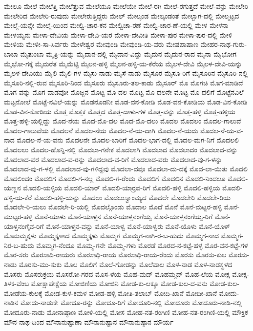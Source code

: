 ಮೇಲೂ
ಮೇಲೆ
ಮೇಲೆತ್ತಿ
ಮೇಲೆತ್ತುವ
ಮೇಲೆಯೂ
ಮೇಲೆಯೇ
ಮೇಲೆ-ರಗಿ
ಮೇಲೆ-ರಗುತ್ತದೆ
ಮೇಲೆ-ವನ್ದು
ಮೇಲೇರಿ
ಮೇಲೇರಿದ
ಮೇಲೇರಿ-ರುವುದು
ಮೇಲೇರುತ್ತಿದ್ದರು
ಮೇಲ್
ಮೇಲ್ಕಂಡ
ಮೇಲ್ಕಂಡಂತೆ
ಮೇಲ್ಬಾಗ-ದಲ್ಲಿ
ಮೇಲ್ಮಟ್ಟದ
ಮೇಲ್ಮೆ-ಯನ್ನೇ
ಮೇಲ್ಮೆ-ಯಿಂದ
ಮೇಲ್ವಿ-ಚಾರ-ಕನ
ಮೇಲ್ವಿಚಾ-ರಣೆ
ಮೇಲ್ವಿ-ಚಾರ-ಣೆ-ಯಲ್ಲಿ
ಮೇಳ
ಮೇಳನಾ
ಮೇಳಯ್ಯನು
ಮೇಳಾ-ದೇವಿಯ
ಮೇಳಾ-ದೇವಿ-ಯರ
ಮೇಳಾ-ದೇವೀತಿ
ಮೇಳಾ-ಪುರ
ಮೇಳಾ-ಪುರ-ದಲ್ಲಿ
ಮೇಳಿ
ಮೇಳಿಯ
ಮೇಳೀ-ಸಾ-ಸಿರ್ವರು
ಮೇಳೇಶ್ವರ
ಮೇವುಂಡಿ
ಮೇವುಂಡಿ-ಯ-ವರು
ಮೇಷಪಾಷಾಣ
ಮೇಹರ-ನಾಥ-ಗುರು-ಬಾಬಾ
ಮೈತುಂಬಾ
ಮೈತ್ರಿ-ಯನ್ನು
ಮೈದಾನ-ದಲ್ಲಿ
ಮೈದಾನ-ವಿದ್ದು
ಮೈದುನ
ಮೈದುನ-ರಾದ
ಮೈನಾ
ಮೈಭೋಗ
ಮೈಭೋ-ಗಕ್ಕೆ
ಮೈಮರೆತ
ಮೈಮೆಟ್ಟಿ
ಮೈಲನ-ಹಳ್ಳಿ
ಮೈಲನ-ಹಳ್ಳಿ-ಯ-ಕೆರೆಯ
ಮೈಲಳ-ದೇವಿ
ಮೈಲಳ-ದೇವಿ-ಯನ್ನು
ಮೈಲಳ-ದೇವಿಯು
ಮೈಲಿ
ಮೈಲಿ-ಗಳ
ಮೈಸು-ನಾಡು-ಮೈಸೆ-ನಾಡು
ಮೈಸೂರ
ಮೈಸೂ-ರಿಗೆ
ಮೈಸೂರಿನ
ಮೈಸೂರಿ-ನಲ್ಲಿ
ಮೈಸೂರಿ-ನಲ್ಲಿ-ರುವ
ಮೈಸೂರಿ-ನಿಂದ
ಮೈಸೂರು
ಮೈಸೂರು-ತಲ-ಕಾಡು
ಮೈಸೂರ್
ಮೊ
ಮೊಗಚಿ
ಮೊಗ-ಮಾಡಿದೆ
ಮೊಗ-ವನ್ನು
ಮೊಗ-ವಾಡವೋ
ಮೊಜ್ಜನ
ಮೊಟ್ಟ-ಮೊ-ದಲ
ಮೊಟ್ಟ-ಮೊ-ದಲನೇ
ಮೊಟ್ಟ-ಮೊ-ದಲಿಗೆ
ಮೊಟ್ಟೆನವಿಲೆ-ಮಟ್ಟನೋಲೆ
ಮೊಟ್ಟೆ-ನವಿಲೆ-ಯನ್ನು
ಮೊಡನೊಡನೀ
ಮೊಡ-ವನ-ಕೋಡಿ
ಮೊಡ-ವನ-ಕೋಡಿಯ
ಮೊಡ-ವಿನ-ಕೋಡಿ
ಮೊಡ-ವಿನ-ಕೋಡಿಯ
ಮೊತ್ತ
ಮೊತ್ತಕ
ಮೊತ್ತದ
ಮೊತ್ತ-ದಾಳು-ಗಳ
ಮೊತ್ತ-ವನ್ನು
ಮೊತ್ತ-ಹಳ್ಳಿ
ಮೊತ್ತ-ಹಳ್ಳಿಯ
ಮೊತ್ತ-ಹಳ್ಳಿ-ಯಲ್ಲಿದ್ದು
ಮೊದ-ನೆಯ
ಮೊದ-ಮೊ-ದಲ
ಮೊದ-ಮೊ-ದಲು
ಮೊದಲ
ಮೊದಲಂ
ಮೊದಲ-ಗಾಲುವೆ
ಮೊದಲ-ಗಾಲುವೆಯ
ಮೊದಲನೆ
ಮೊದಲ-ನೆಯ
ಮೊದಲ-ನೆ-ಯ-ದಾಗಿ
ಮೊದಲ-ನೆ-ಯದು
ಮೊದಲ-ನೆ-ಯ-ವ-ನಾದ
ಮೊದಲ-ನೆ-ಯ-ವನು
ಮೊದಲನೇ
ಮೊದಲ-ಬಾರಿಗೆ
ಮೊದಲ-ಭಾಗ-ದಲ್ಲಿ
ಮೊದಲ-ಮಗ-ನಿಗೆ
ಮೊದಲಲಿ
ಮೊದಲಲು
ಮೊದಲ-ಹೊನ್ನಿ-ನಲ್ಲಿ
ಮೊದಲಾ-ಗನೇಕ
ಮೊದಲಾಗಿ
ಮೊದಲಾದ
ಮೊದಲಾದಂ
ಮೊದಲಾದ-ವನ್ನು
ಮೊದಲಾದ-ವರ
ಮೊದಲಾದ-ವ-ರನ್ನು
ಮೊದಲಾದ-ವ-ರಿಗೆ
ಮೊದಲಾದ-ವರು
ಮೊದಲಾದ-ವು-ಗ-ಳನ್ನು
ಮೊದಲಾದ-ವು-ಗ-ಳಲ್ಲಿ
ಮೊದಲಾದ-ವು-ಗಳಿದ್ದವು
ಮೊದಲಾ-ದವೂ
ಮೊದಲಾ-ದು-ದಕ್ಕೆ
ಮೊದ-ಲಾ-ಯಿತು
ಮೊದಲಿ
ಮೊದಲಿಂದಂ
ಮೊದಲಿಗ
ಮೊದಲಿ-ಗ-ನಲ್ಲ
ಮೊದಲಿ-ಗ-ರೆಂದು
ಮೊದಲಿಗೆ
ಮೊದಲಿನ
ಮೊದಲಿ-ನಿಂದಲೂ
ಮೊದಲಿ-ಯಣ್ಣನ
ಮೊದಲಿ-ಯಳ್ಳಿಯ
ಮೊದಲಿ-ಯಾರ್
ಮೊದಲಿ-ಯಾರ್ರವ-ರಿಗೆ
ಮೊದಲಿ-ಹಳ್ಳಿ
ಮೊದಲಿ-ಹಳ್ಳಿಯ
ಮೊದಲಿ-ಹಳ್ಳಿ-ಯ-ಕೆರೆ
ಮೊದಲಿ-ಹಳ್ಳಿ-ಯನ್ನು
ಮೊದಲು
ಮೊದಲುಸ್ವಾಂಮ್ಯದ
ಮೊದಲೇ
ಮೊದಲೇರಿ
ಮೊದಲೇ-ರಿಯ
ಮೊದಲೇ-ರಿ-ಯಲು
ಮೊದಲೇ-ರಿ-ಯಲ್ಲಿ
ಮೊದಲ್ಗೊಂಡು
ಮೊದಾಲ
ಮೊದೆ
ಮೊನೆ
ಮೊನೆ-ಮಟ್ಟರ-ಹಳ್ಳಿ
ಮೊನೆ-ಮುಟ್ಟರ-ಹಳ್ಳಿ
ಮೊನೆ-ಯಾಳು
ಮೊನೆ-ಯಾಳ್ತನ
ಮೊನೆ-ಯಾಳ್ತನಂಗೆಯ್ವ
ಮೊನೆ-ಯಾಳ್ತನಂಗೆಯ್ವ-ರಿಗೆ
ಮೊನೆ-ಯಾಳ್ತನಂಗೈವ-ರಿಗೆ
ಮೊನೆ-ಯಾಳ್ತನ-ವನ್ನು
ಮೊನೆ-ಯಾಳ್ವ
ಮೊನೆ-ಯಾಳ್ವರು
ಮೊನೆ-ಯೊಳು
ಮೊನೆ-ಯೊಳ್
ಮೊಮಮ್ಮಕ್ಕಳು
ಮೊಮ್ಮಕ್ಕಳಾದ
ಮೊಮ್ಮಕ್ಕಳು
ಮೊಮ್ಮಗ
ಮೊಮ್ಮಗ-ನಾಗಿ-ರ-ಬ-ಹುದು
ಮೊಮ್ಮಗ-ನಾದ
ಮೊಮ್ಮಗ-ನಿರ-ಬ-ಹುದು
ಮೊಮ್ಮಗ-ನೆಂದೂ
ಮೊಮ್ಮ-ಗನೇ
ಮೊಮ್ಮ-ಗಳು
ಮೊರಡೆ
ಮೊರದ-ನ-ಕಟ್ಟೆ-ಹಳ್ಳ
ಮೊರ-ವನ-ಕಟ್ಟೆ-ಗಳ
ಮೊರ-ಸರು
ಮೊರಸಾದಿ-ರಾಯರು
ಮೊರಸಾಧಿ-ರಾಯ
ಮೊರಸಾಧಿ-ರಾಯ-ರೆಂದು
ಮೊರಸು
ಮೊರಸು-ಕುಲ
ಮೊರಸು-ನಾಡು
ಮೊರಸು-ಮು-ಸುಕು
ಮೊಲ
ಮೊಲಿಗೆ
ಮೊಲೆ-ಗೋಡನ್ನು
ಮೊಲೆವಾಲ
ಮೊಳ-ನಾಡ
ಮೊಳ-ನಾಡಸ್ಥಳದ
ಮೊಸರು
ಮೊಸರುಕ್ರಯ
ಮೊಸರೋ-ಗರದ
ಮೊಸ-ಳೆಯ
ಮೊಹ-ಮದ್
ಮೊಹಮ್ಮದ್
ಮೊಹ-ಲೆಯ
ಮೋಕ್ಷ
ಮೋಕ್ಷ-ತಿಳಕ-ವೆಂಬ
ಮೋಕ್ಷಾಪೇಕ್ಷೆಯ
ಮೋಜಿಣಿಯ
ಮೋಜಿನಿ
ಮೋಡ-ಕು-ಲಕ್ಕೂ
ಮೋಡ-ಕುಲ-ದ-ವನು
ಮೋಡ-ಕುಲ-ಮೋಡೆಯ-ಕುಲಕ್ಕೆ
ಮೋಡ-ಕುಳ-ಕಮಳ
ಮೋಡ-ಹಳ್ಳಿ
ಮೋತಿ-ತಲಾಬ್
ಮೋದಿ-ಖಾನೆ
ಮೋದೀ-ಖಾನೆ
ಮೋದು-ನಾಡಿನ
ಮೋದು-ನಾಡುಕೇ
ಮೋದೂ-ರನ್ನು
ಮೋದೂ-ರಿಗೆ
ಮೋದೂರಿ-ನಲ್ಲಿ
ಮೋದೂರು
ಮೋದೂರು-ನಾಡಿ-ನಲ್ಲಿ
ಮೋದೂರು-ನಾಡು
ಮೋನಾಷ್ಠಾಣ
ಮೋಳಿ-ಯಲ್ಲಿ
ಮೋಸ
ಮೋಹ-ನತ-ರಂಗಿಣಿ
ಮೋಹ-ನತ-ರಂಗಿಣಿ-ಯಲ್ಲಿ
ಮೌಕ್ತಿಕ
ಮೌನ-ನಾಥ-ದಿಂದ
ಮೌನಾನುಷ್ಟಾಣಾ
ಮೌನಾನುಷ್ಟಾನ
ಮೌನಾನುಷ್ಠಾನ
ಮೌರ್ಯ
